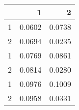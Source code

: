 \begin{tabular}{lrr}
\toprule
{} &       1 &       2 \\
\midrule
1 &  0.0602 &  0.0738 \\
2 &  0.0694 &  0.0235 \\
1 &  0.0769 &  0.0861 \\
2 &  0.0814 &  0.0280 \\
1 &  0.0976 &  0.1009 \\
2 &  0.0958 &  0.0331 \\
\bottomrule
\end{tabular}
